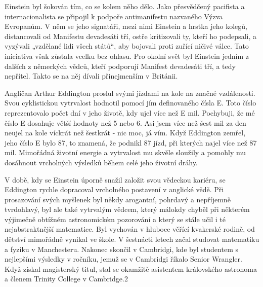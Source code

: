  Einstein byl šokován tím, co se kolem něho dělo. Jako přesvědčený pacifista a internacionalista se
  připojil k podpoře antimanifestu nazvaného Výzva Evropanům. V něm se jeho signatáři, mezi nimi
  Einstein a hrstka jeho kolegů, distancovali od Manifestu devadesáti tří, ostře kritizovali ty,
  kteří ho podepsali, a vyzývali „vzdělané lidi všech států“, aby bojovali proti zuřící ničivé
  válce. Tato iniciativa však zůstala vcelku bez ohlasu. Pro okolní svět byl Einstein jedním z
  dalších z německých vědců, kteří podporují Manifest devadesáti tří, a tedy nepřítel. Takto se na
  něj dívali přinejmenším v Británii. 
  
  Angličan Arthur Eddington proslul svými jízdami na kole na značné vzdálenosti. Svou cyklistickou
  vytrvalost hodnotil pomocí jím definovaného čísla E. Toto číslo reprezentovalo počet dní v jeho
  životě, kdy ujel více než E mil. Pochybuji, že mé číslo E dosahuje větší hodnoty než 5 nebo 6. Asi
  jsem více než šest mil za den neujel na kole víckrát než šestkrát - nic moc, já vím. Když
  Eddington zemřel, jeho číslo E bylo 87, to znamená, že podnikl 87 jízd, při kterých najel více než
  87 mil. Mimořádná životní energie a vytrvalost mu skvěle sloužily a pomohly mu dosáhnout
  vrcholných výsledků během celé jeho životní dráhy. 
  
  V době, kdy se Einstein úporně snažil založit svou vědeckou kariéru, se Eddington rychle
  dopracoval vrcholného postavení v anglické vědě. Při prosazování svých myšlenek byl někdy
  arogantní, pohrdavý a nepříjemně tvrdohlavý, byl ale také vytrvalým vědcem, který málokdy chyběl
  při některém výjimečně obtížném astronomickém pozorování a který se stále učil i té
  nejabstraktnější matematice. Byl vychován v hluboce věřící kvakerské rodině, od dětství mimořádně
  vynikal ve škole. V šestnácti letech začal studovat matematiku a fyziku v Manchesteru. Nakonec
  skončil v Cambridgi, kde byl studentem s nejlepšími výsledky v ročníku, jemuž se v Cambridgi
  říkalo Senior Wrangler. Když získal magisterský titul, stal se okamžitě asistentem královského
  astronoma a členem Trinity College v Cambridge.2 
  
